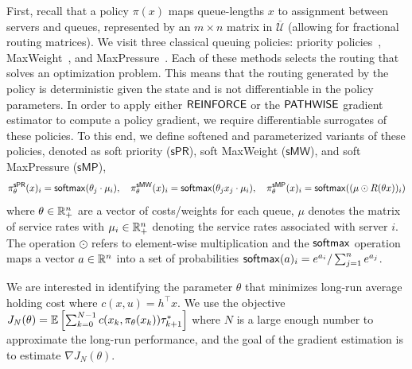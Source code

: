First, recall that a policy $\pi(x)$ maps queue-lengths $x$ to assignment between servers and queues, represented by an $m \times n$ matrix in $\overline{\mathcal{U}}$ (allowing for fractional routing matrices). We visit three classical queuing policies: priority policies~\cite{cox1961queues}, MaxWeight~\cite{tassiulas1990stability}, and MaxPressure~\cite{dai2005maximum}. Each of these methods selects the routing that solves an optimization problem. This means that the routing generated by the policy is deterministic given the state and is not differentiable in the policy parameters. In order to apply either $\mathsf{REINFORCE}$ or the $\mathsf{PATHWISE}$ gradient estimator to compute a policy gradient, we require differentiable surrogates of these policies. To this end, we define softened and parameterized variants of these policies, denoted as soft priority ($\mathsf{sPR}$), soft MaxWeight ($\mathsf{sMW}$), and soft MaxPressure ($\mathsf{sMP}$),
\begin{equation}
\label{eqn:soft_policies}
\pi^{\mathsf{sPR}}_{\theta}(x)_{i}= \mathop{\mathsf{softmax}}(\theta_{j} \cdot \mu_{i}), \quad
\pi^{\mathsf{sMW}}_{\theta}(x)_{i}= 
\mathop{\mathsf{softmax}}(\theta_{j}x_{j} \cdot \mu_{i}), \quad 
\pi^{\mathsf{sMP}}_{\theta}(x)_{i} = \mathop{\mathsf{softmax}}((\mu \odot R(\theta x))_{i})
\end{equation}
where $\theta \in \mathbb{R}_{+}^{n}$ are a vector of costs/weights for each queue, $\mu$ denotes the matrix of service rates with $\mu_{i} \in \mathbb{R}_{+}^{n}$ denoting the service rates associated with server $i$. 
The operation $\odot$ refers to element-wise multiplication and the
$\mathop{\mathsf{softmax}}$ operation maps a vector $a \in \mathbb{R}^{n}$ into a set of probabilities $\mathop{\mathsf{softmax}}(a)_{i} = e^{a_{i}} / \sum_{j=1}^{n} e^{a_{j}}$.






We are interested in identifying the parameter $\theta$ that minimizes long-run average holding cost where $c(x,u) = h^{\top} x$. 
We use the objective 
$J_{N}(\theta) = \mathbb{E}\left[\sum_{k=0}^{N-1}c(x_{k},\pi_{\theta}(x_{k}))\tau^{*}_{k+1}\right]$
where $N$ is a large enough number to approximate the long-run performance, and the goal of the gradient estimation is to estimate $\nabla J_{N}(\theta)$.

